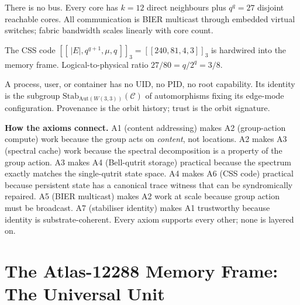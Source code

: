 \documentclass[11pt,letterpaper]{article}
\theoremstyle{remark}
\newcommand{\W}{W(3,3)}
\newcommand{\Aut}{\mathrm{Aut}}
\newcommand{\Stab}{\mathrm{Stab}}
\begin{document}
\begin{designprinciple}
There is no bus. Every core has $k=12$ direct neighbours plus $q^q = 27$ disjoint
reachable cores. All communication is BIER multicast through embedded virtual switches;
fabric bandwidth scales linearly with core count.
\end{designprinciple}

\begin{designprinciple}
The CSS code $[[\,|E|, q^{q+1}, \mu, q\,]]_3 = [[240, 81, 4, 3]]_3$ is hardwired into the
memory frame. Logical-to-physical ratio $27/80 = q/2^q = 3/8$.
\end{designprinciple}

\begin{designprinciple}
A process, user, or container has no UID, no PID, no root capability. Its identity is
the subgroup $\Stab_{\Aut(\W)}(\mathcal{C})$ of automorphisms fixing its edge-mode
configuration. Provenance is the orbit history; trust is the orbit signature.
\end{designprinciple}

\begin{connection}
\textbf{How the axioms connect.} A1 (content addressing) makes A2 (group-action compute)
work because the group acts on \emph{content}, not locations. A2 makes A3 (spectral
cache) work because the spectral decomposition is a property of the group action. A3
makes A4 (Bell-qutrit storage) practical because the spectrum exactly matches the
single-qutrit state space. A4 makes A6 (CSS code) practical because persistent state has
a canonical trace witness that can be syndromically repaired. A5 (BIER multicast) makes A2 work at scale because group action
must be broadcast. A7 (stabiliser identity) makes A1 trustworthy because identity is
substrate-coherent. Every axiom supports every other; none is layered on.
\end{connection}

\section{The Atlas-12288 Memory Frame: The Universal Unit}\label{sec:atlas}
\end{document}
